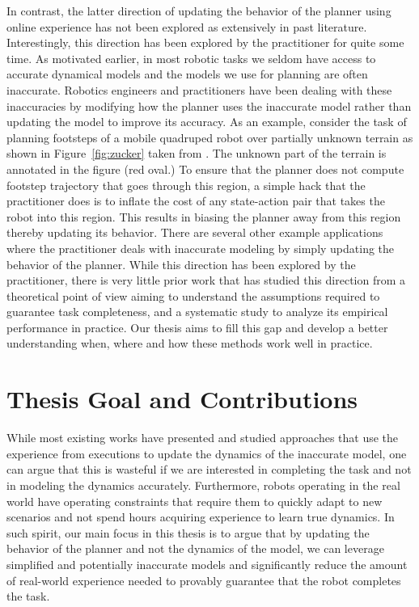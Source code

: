 In contrast, the latter direction of updating the behavior of the
planner using online experience has not been explored as extensively
in past literature. Interestingly, this direction has been explored by
the practitioner for quite some time. As motivated earlier, in most
robotic tasks we seldom have access to accurate dynamical models and
the models we use for planning are often inaccurate. Robotics
engineers and practitioners have been dealing with these inaccuracies
by modifying how the planner uses the inaccurate model rather than
updating the model to improve its accuracy. As an example, consider
the task of planning footsteps of a mobile quadruped robot over
partially unknown terrain as shown in Figure~\ref{fig:zucker} taken
from \cite{DBLP:journals/ijrr/ZuckerRSCBAK11}. The
unknown part of the terrain is annotated in the figure (red oval.) To
ensure that the planner does not compute footstep trajectory that goes
through this region, a simple
hack that the practitioner does is to inflate the cost of any
state-action pair that takes the robot into this region. This results
in biasing the planner away from this region thereby updating its
behavior. There are several other example applications where the
practitioner deals with inaccurate modeling by simply updating the
behavior of the planner. While this direction has been explored by the
practitioner, there is very little prior work that has studied this
direction from a theoretical point of view aiming to understand the
assumptions required to guarantee task completeness, and a systematic
study to analyze its empirical performance in practice. Our thesis
aims to fill this gap and develop a better understanding when, where
and how these methods work well in practice.

\section{Thesis Goal and Contributions}
\label{sec:thes-goal-contr}

While most existing works have presented and studied approaches that
use the experience from executions to update the dynamics of the
inaccurate model, one can argue that this is wasteful if we are interested in
completing the task and not in modeling the dynamics
accurately. Furthermore, robots operating in the real world have
operating constraints that require them to quickly adapt to
new scenarios and not spend hours acquiring experience to learn true
dynamics. In such spirit, our main focus in this thesis is to argue that by updating the
behavior of the planner and not the dynamics of the model, we can
leverage simplified and potentially inaccurate models and
significantly reduce the amount of real-world experience needed to
provably guarantee that the robot completes the task.

